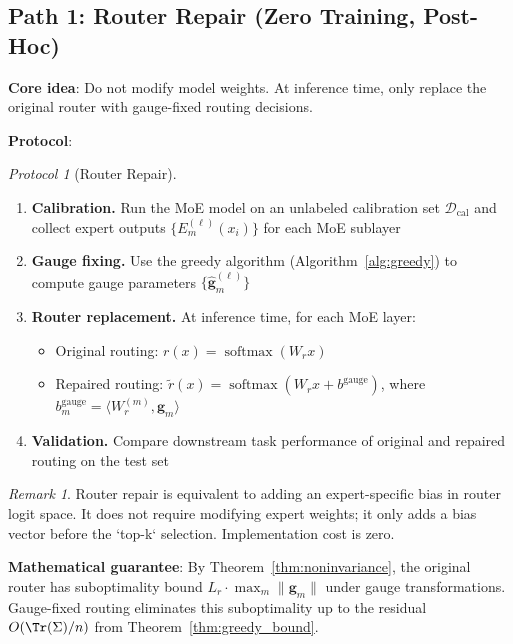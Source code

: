 \documentclass[12pt,a4paper]{article}
\theoremstyle{remark}
\newtheorem{remark}[theorem]{Remark}
\newtheorem{protocol}[theorem]{Protocol}
\newcommand{\D}{\mathcal{D}}
\DeclareMathOperator{\softmax}{softmax}
\begin{document}
\subsection{Path 1: Router Repair (Zero Training, Post-Hoc)}

\textbf{Core idea}: Do not modify model weights. At inference time, only replace the original router with gauge-fixed routing decisions.

\textbf{Protocol}:

\begin{protocol}[Router Repair]
\label{prot:repair}
\begin{enumerate}
    \item \textbf{Calibration.} Run the MoE model on an unlabeled calibration set $\D_{\text{cal}}$ and collect expert outputs $\{E_m^{(\ell)}(x_i)\}$ for each MoE sublayer
    \item \textbf{Gauge fixing.} Use the greedy algorithm (Algorithm~\ref{alg:greedy}) to compute gauge parameters $\{\hat{\mathbf{g}}_m^{(\ell)}\}$
    \item \textbf{Router replacement.} At inference time, for each MoE layer:
    \begin{itemize}
        \item Original routing: $r(x) = \softmax(W_r x)$
        \item Repaired routing: $\tilde{r}(x) = \softmax(W_r x + b^{\text{gauge}})$, where $b^{\text{gauge}}_m = \langle W_r^{(m)}, \hat{\mathbf{g}}_m \rangle$
    \end{itemize}
    \item \textbf{Validation.} Compare downstream task performance of original and repaired routing on the test set
\end{enumerate}
\end{protocol}

\begin{remark}
Router repair is equivalent to adding an expert-specific bias in router logit space. It does not require modifying expert weights; it only adds a bias vector before the `top-k` selection. Implementation cost is zero.
\end{remark}

\textbf{Mathematical guarantee}: By Theorem~\ref{thm:noninvariance}, the original router has suboptimality bound $L_r \cdot \max_m \|\mathbf{g}_m\|$ under gauge transformations. Gauge-fixed routing eliminates this suboptimality up to the residual $O(\Tr(\Sigma)/n)$ from Theorem~\ref{thm:greedy_bound}.
\end{document}
